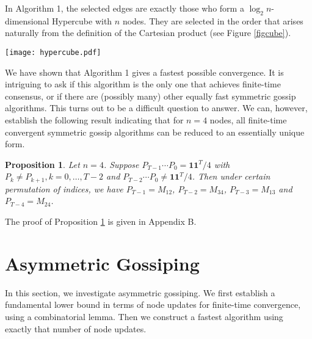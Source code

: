 \documentclass[a4paper, 11pt]{article}
\newtheorem{proposition}{Proposition}
\begin{document}
\medskip


In Algorithm 1, the selected edges are exactly those who form a  $
\log_2 n$-dimensional Hypercube with $n$ nodes. They are selected in the order that arises naturally from the definition of the Cartesian product (see Figure \ref{figcube}).

\begin{figure*}[t]
\begin{center}
\texttt{[image: hypercube.pdf]}
\caption{An illustration of Algorithm 1 with $n=2$, $4$, and $8$ nodes. The edges selected in the same step are marked with the same line style. The algorithm builds hypercubes  $\mathrm{H}^{1}$,   $\mathrm{H}^{2}$, and $\mathrm{H}^{3}$. }\label{figcube}
\end{center}
\end{figure*}


 We have shown that Algorithm 1 gives a fastest possible convergence. It is intriguing to ask if this algorithm is the only one that achieves finite-time consensus, or if there are (possibly many) other equally fast symmetric gossip algorithms. This turns out to be a difficult question to answer. We can, however, establish the following result indicating that for $n=4$ nodes, all finite-time convergent symmetric gossip algorithms can be reduced to an essentially unique form.

\medskip

\begin{proposition}\label{unique}
Let $n=4$. Suppose $P_{T-1} \cdots P_0 =\mathbf{1} \mathbf{1}^T/4$ with $P_k\neq P_{k+1}, k=0,\dots,T-2$ and $P_{T-2} \cdots P_0 \neq \mathbf{1} \mathbf{1}^T/4$.  Then under certain permutation of indices, we have $P_{T-1}=M_{12}$, $P_{T-2}=M_{34}$, $P_{T-3}=M_{13}$ and $P_{T-4}=M_{24}$.
\end{proposition}

\medskip

The proof of Proposition \ref{unique} is given in Appendix B.










\section{Asymmetric Gossiping}\label{Sec:Asymmetric}
In this section, we investigate  asymmetric gossiping.  We first establish a fundamental lower bound in terms of node updates for finite-time convergence,  using a combinatorial lemma. Then we construct a fastest algorithm using exactly that number of node updates.
\end{document}

